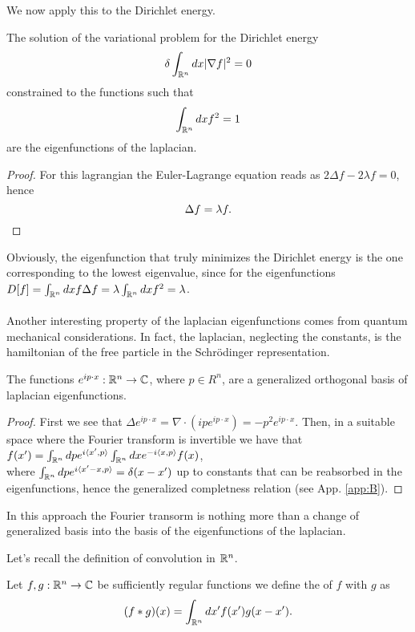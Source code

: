 \documentclass[../2.tex]{subfiles}
\begin{document}
We now apply this to the Dirichlet energy.

\begin{prop}
    The solution of the variational problem for the Dirichlet energy
    \[ \delta\int_{\mathbb{R}^n} dx | \nabla f |^2 = 0 \]
    constrained to the functions such that 
    \[ \int_{\mathbb{R}^n} dx f^2 = 1 \]
    are the eigenfunctions of the laplacian.
\end{prop}
\begin{proof}
    For this lagrangian the Euler-Lagrange equation reads as $ 2 \Delta f - 2\lambda f = 0$,
    hence 
    \[ \Delta f = \lambda f . \qedhere \]

\end{proof}

Obviously, the eigenfunction that truly minimizes the Dirichlet energy is the one corresponding to the lowest eigenvalue,
since for the eigenfunctions $D[f] = \int_{\mathbb{R}^n} dx f \Delta f = \lambda \int_{\mathbb{R}^n} dx f^2 = \lambda$.\\
\hfill \\

Another interesting property of the laplacian eigenfunctions comes from quantum mechanical considerations.
In fact, the laplacian, neglecting the constants, is the hamiltonian of the free particle in the Schr\"{o}dinger representation.

\begin{prop}
    The functions $e^{ip\cdot x} : \mathbb{R}^n \to \mathbb{C}$, where $p \in R^n$, are a generalized orthogonal basis of laplacian eigenfunctions.
\end{prop}
\begin{proof} 
    First we see that $\Delta e^{ip\cdot x} = \nabla \cdot (ipe^{ip\cdot x}) = -p^2 e^{ip\cdot x}$.
    Then, in a suitable space where the Fourier transform is invertible we have that $f(x') = \int_{\mathbb{R}^n} dp e^{i\langle x', p \rangle}\int_{\mathbb{R}^n} dx e^{-i\langle x, p \rangle}f(x)$, 
    \\where $\int_{\mathbb{R}^n} dp e^{i\langle x'-x, p \rangle} = \delta(x-x')$ up to constants that can be reabsorbed in the eigenfunctions, hence the generalized completness relation (see App. \ref{app:B}). \qedhere
\end{proof}

In this approach the Fourier transorm is nothing more than a change of generalized basis into the basis of the eigenfunctions of the laplacian.

Let's recall the definition of convolution in $\mathbb{R}^n$.

\begin{defn}
    Let $f,g : \mathbb{R}^n \to \mathbb{C}$ be sufficiently regular functions we define the  of $f$ with $g$ as
    \[ (f * g)(x) = \int_{\mathbb{R}^n} dx' f(x')g(x-x').\]
\end{defn}
\end{document}
